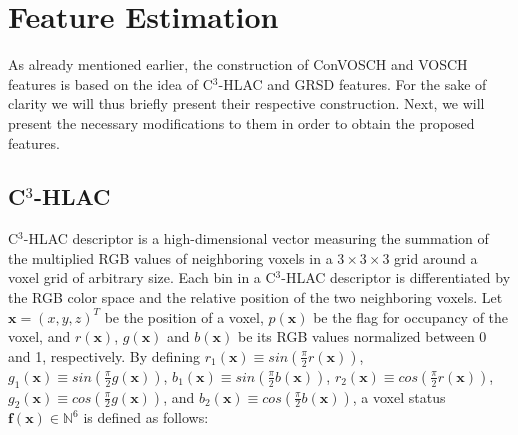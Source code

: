 \documentclass[a4paper, 10 pt, conference]{sty/ieeeconf}
\begin{document}
\section{Feature Estimation}
\label{sec:features}
As already mentioned earlier, the construction of ConVOSCH and VOSCH features is based on the idea of 
C$^3$-HLAC and GRSD features. For the sake of clarity we will thus briefly present
their respective construction.
Next, we will present the necessary modifications to them in order to obtain the proposed features.

\subsection{C$^3$-HLAC}
\label{sec:color_chlac}
C$^3$-HLAC descriptor is a high-dimensional vector measuring the summation of the 
multiplied RGB values of neighboring voxels in a $3 \times 3 \times 3$ grid around a voxel grid of arbitrary size. 
Each bin in a C$^3$-HLAC descriptor is differentiated by the RGB color space and the 
relative position of the two neighboring voxels. 
Let $\bm{x}=(x,y,z)^T$ be the position of a voxel, $p(\bm{x})$ be the flag for occupancy 
of the voxel, and $r(\bm{x})$, $g(\bm{x})$ and $b(\bm{x})$ be its RGB values normalized 
between 0 and 1, respectively.  By defining 
$r_1(\bm{x}) \equiv sin\left( \frac{\pi}{2}r(\bm{x})\right)$, $g_1(\bm{x}) \equiv sin\left( \frac{\pi}{2}g(\bm{x})\right)$, $b_1(\bm{x}) \equiv sin\left( \frac{\pi}{2}b(\bm{x})\right)$, 
$r_2(\bm{x}) \equiv cos\left( \frac{\pi}{2}r(\bm{x})\right)$, $g_2(\bm{x}) \equiv cos\left( \frac{\pi}{2}g(\bm{x})\right)$, and $b_2(\bm{x}) \equiv cos\left( \frac{\pi}{2}b(\bm{x})\right)$, 
a voxel status $\bm{f}(\bm{x})\in \mathbb{N}^6$ is defined as follows: 
\end{document}
